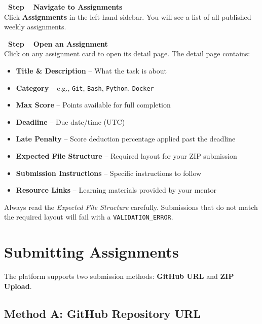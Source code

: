 \documentclass[12pt,a4paper]{article}
\newcounter{stepnum}
\newcommand{\step}[1]{%
  \stepcounter{stepnum}%
  \vspace{6pt}%
  \noindent\colorbox{eyantraBlue}{\color{white}\bfseries\small\ Step \thestepnum\ }%
  \hspace{4pt}\textbf{#1}\\[4pt]%
}
\begin{document}
\setcounter{stepnum}{0}

\step{Navigate to Assignments}
Click \textbf{Assignments} in the left-hand sidebar. You will see a list of all published weekly assignments.

\step{Open an Assignment}
Click on any assignment card to open its detail page. The detail page contains:

\begin{itemize}
  \item \textbf{Title \& Description} -- What the task is about
  \item \textbf{Category} -- e.g., \texttt{Git}, \texttt{Bash}, \texttt{Python}, \texttt{Docker}
  \item \textbf{Max Score} -- Points available for full completion
  \item \textbf{Deadline} -- Due date/time (UTC)
  \item \textbf{Late Penalty} -- Score deduction percentage applied past the deadline
  \item \textbf{Expected File Structure} -- Required layout for your ZIP submission
  \item \textbf{Submission Instructions} -- Specific instructions to follow
  \item \textbf{Resource Links} -- Learning materials provided by your mentor
\end{itemize}

\begin{warnbox}
  Always read the \emph{Expected File Structure} carefully. Submissions that do not match the required layout will fail with a \texttt{VALIDATION\_ERROR}.
\end{warnbox}

\section{Submitting Assignments}

The platform supports two submission methods: \textbf{GitHub URL} and \textbf{ZIP Upload}.

\subsection{Method A: GitHub Repository URL}

\setcounter{stepnum}{0}
\end{document}
